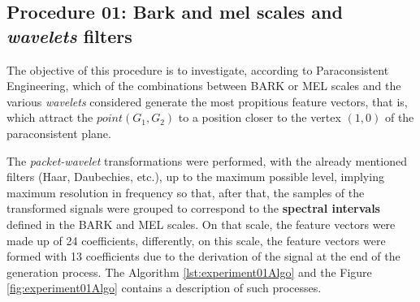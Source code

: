 		\subsection{Procedure 01: Bark and mel scales and \textit{wavelets} filters}
			\label{sec:propApproach:subsec:Experiment1}
			\par The objective of this procedure is to investigate, according to Paraconsistent Engineering, which of the combinations between BARK or MEL scales and the various \textit{wavelets} considered generate the most propitious feature vectors, that is, which attract the $point(G_1, G_2)$ to a position closer to the vertex $(1,0)$ of the paraconsistent plane.
			
			\par The \textit{packet-wavelet} transformations were performed, with the already mentioned filters (Haar, Daubechies, etc.), up to the maximum possible level, implying maximum resolution in frequency so that, after that, the samples of the transformed signals were grouped to correspond to the \textbf{spectral intervals} defined in the BARK and MEL scales. On that scale, the feature vectors were made up of 24 coefficients, differently, on this scale, the feature vectors were formed with 13 coefficients due to the derivation of the signal at the end of the generation process. The Algorithm \ref{lst:experiment01Algo} and the Figure \ref{fig:experiment01Algo} contains a description of such processes.
			
			
			

